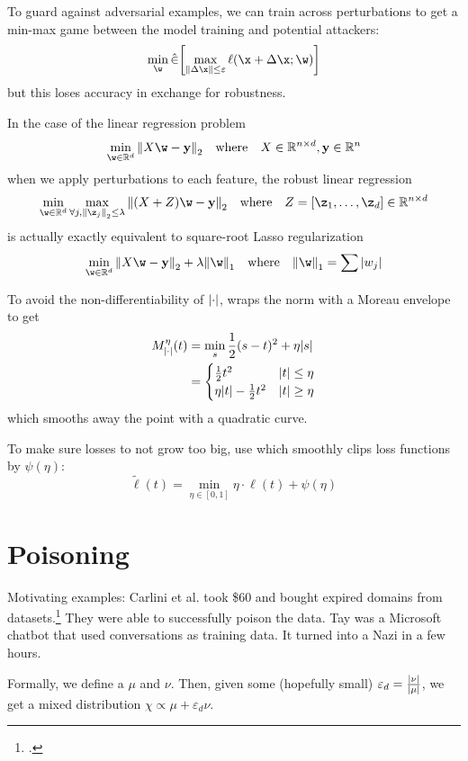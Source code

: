 \documentclass[class=cs480,notes,tikz]{agony}
\begin{document}
To guard against adversarial examples, we can train across perturbations
to get a min-max game between the model training and potential attackers:
\[ \min_{\w} \hat{\E}\qty[\max_{\norm{\Delta\x}\leq\varepsilon}\ell(\x+\Delta\x;\w)] \]
but this loses accuracy in exchange for robustness.

In the case of the linear regression problem
\[ \min_{\w\in\R^d} \norm{X\w - \vb y}_2 \qq{where} X \in \R^{n \times d}, \vb y \in \R^n \]
when we apply perturbations to each feature, the robust linear regression
\[ \min_{\w\in\R^d} \max_{\forall j,\norm{\z_j}_2\leq\lambda} \norm{(X+Z)\w-\vb y}_2 \qq{where} Z = [\z_1,\dotsc,\z_d] \in \R^{n \times d} \]
is actually exactly equivalent to square-root Lasso regularization
\[ \min_{\w\in\R^d} \norm{X\w-\vb y}_2 + \lambda\norm{\w}_1 \qq{where} \norm{\w}_1 = \sum \abs{w_j} \]

To avoid the non-differentiability of $\abs{\cdot}$, 
wraps the norm with a Moreau envelope to get
\begin{align*}
  M^\eta_{\abs{\cdot}}(t) & = \min_s \frac12(s-t)^2 + \eta\abs{s}        \\
                          & = \begin{cases}
                                \frac12t^2             & \abs{t} \leq \eta \\
                                \eta\abs{t}-\frac12t^2 & \abs{t} \geq \eta
                              \end{cases}
\end{align*}
which smooths away the point with a quadratic curve.

To make sure losses to not grow too big, use 
which smoothly clips loss functions by $\psi(\eta)$:
\[ \tilde{\ell}(t) = \min_{\eta\in[0,1]} \eta\cdot\ell(t) + \psi(\eta) \]

\section{Poisoning}

Motivating examples:
Carlini et al. took \$60 and bought expired domains from datasets.\footcite{carlini_poisoning_2023}
They were able to successfully poison the data.
Tay was a Microsoft chatbot that used conversations as training data.
It turned into a Nazi in a few hours.

Formally, we define a  $\mu$
and  $\nu$.
Then, given some (hopefully small) 
$\varepsilon_d = \frac{\abs{\nu}}{\abs{\mu}}$,
we get a mixed distribution $\chi \propto \mu + \varepsilon_d\nu$.
\end{document}
